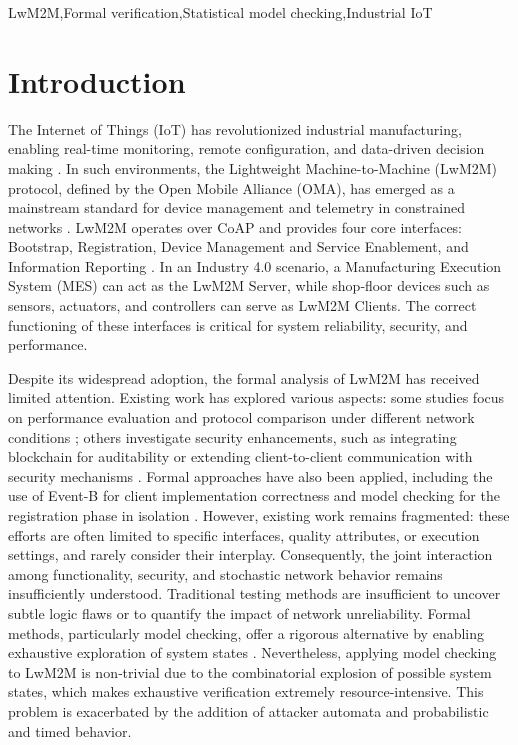 \documentclass[a4paper,fleqn]{cas-sc}
\begin{document}
\begin{keywords}
LwM2M\sep Formal verification\sep Statistical model checking\sep Industrial IoT
\end{keywords}

\maketitle

\section{Introduction}
The Internet of Things (IoT) has revolutionized industrial manufacturing, enabling real-time monitoring, remote configuration, and data-driven decision making \cite{malik2021industrial}. In such environments, the Lightweight Machine-to-Machine (LwM2M) protocol, defined by the Open Mobile Alliance (OMA), has emerged as a mainstream standard for device management and telemetry in constrained networks \cite{robles2024industrial}. LwM2M operates over CoAP and provides four core interfaces: Bootstrap, Registration, Device Management and Service Enablement, and Information Reporting \cite{jimenez2024managing}. In an Industry 4.0 scenario, a Manufacturing Execution System (MES) can act as the LwM2M Server, while shop‑floor devices such as sensors, actuators, and controllers can serve as LwM2M Clients. The correct functioning of these interfaces is critical for system reliability, security, and performance.

Despite its widespread adoption, the formal analysis of LwM2M has received limited attention. Existing work has explored various aspects: some studies focus on performance evaluation and protocol comparison under different network conditions \cite{parmigiani2021comparison}; others investigate security enhancements, such as integrating blockchain for auditability \cite{martin2020providing} or extending client-to-client communication with security mechanisms \cite{lanzieri2022secure}. Formal approaches have also been applied, including the use of Event-B for client implementation correctness \cite{mouakher2020toward} and model checking for the registration phase in isolation \cite{penchevaformal}. 
However, existing work remains fragmented: these efforts are often limited to specific interfaces, quality attributes, or execution settings, and rarely consider their interplay. Consequently, the joint interaction among functionality, security, and stochastic network behavior remains insufficiently understood.
Traditional testing methods are insufficient to uncover subtle logic flaws or to quantify the impact of network unreliability. Formal methods, particularly model checking, offer a rigorous alternative by enabling exhaustive exploration of system states \cite{woodcock2009formal}. Nevertheless, applying model checking to LwM2M is non‑trivial due to the combinatorial explosion of possible system states, which makes exhaustive verification extremely resource‑intensive. This problem is exacerbated by the addition of attacker automata and probabilistic and timed behavior.
\end{document}
